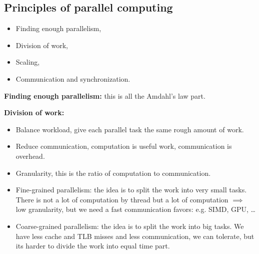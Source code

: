 \subsection{Principles of parallel computing}
    \begin{itemize}[left=10pt, label=\textbullet]
        \item Finding enough parallelism, 
        \item Division of work, 
        \item Scaling, 
        \item Communication and synchronization.
    \end{itemize}
    \begin{tcolorbox}[gris]
    \textbf{Finding enough parallelism:} this is all the Amdahl's law part.
    \end{tcolorbox}
    \begin{tcolorbox}[gris]
        \textbf{Division of work:}
        \begin{itemize}[left=10pt, label=\textbullet]
            \item Balance workload, give each parallel task the same rough amount of work.
            \item Reduce communication, computation is useful work, communication is overhead.
            \item Granularity, this is the ratio of computation to communication.
            \item Fine-grained parallelism: the idea is to split the work into very small tasks. There is not a lot of computation by thread but a lot of computation $\implies$ low granularity, but we need a fast communication favors: e.g. SIMD, GPU, \ldots 
            \item Coarse-grained parallelism: the idea is to split the work into big tasks. We have less cache and TLB misses and less communication, we can tolerate, but its harder to divide the work into equal time part.
        \end{itemize}
    \end{tcolorbox}

